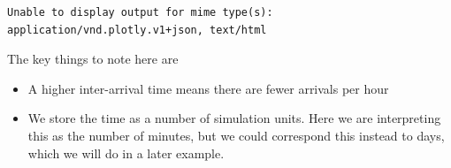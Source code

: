 \documentclass[
  letterpaper,
  DIV=11,
  numbers=noendperiod]{scrreprt}
\providecommand{\tightlist}{%
  \setlength{\itemsep}{0pt}\setlength{\parskip}{0pt}}\usepackage{longtable,booktabs,array}
\begin{document}
\begin{verbatim}
Unable to display output for mime type(s): application/vnd.plotly.v1+json, text/html
\end{verbatim}

\begin{tcolorbox}[enhanced jigsaw, colframe=quarto-callout-tip-color-frame, bottomtitle=1mm, breakable, rightrule=.15mm, coltitle=black, colbacktitle=quarto-callout-tip-color!10!white, opacityback=0, leftrule=.75mm, arc=.35mm, toptitle=1mm, title=\textcolor{quarto-callout-tip-color}{\faLightbulb}\hspace{0.5em}{Tip}, titlerule=0mm, colback=white, toprule=.15mm, bottomrule=.15mm, left=2mm, opacitybacktitle=0.6]

The key things to note here are

\begin{itemize}
\tightlist
\item
  A higher inter-arrival time means there are fewer arrivals per hour
\item
  We store the time as a number of simulation units. Here we are
  interpreting this as the number of minutes, but we could correspond
  this instead to days, which we will do in a later example.
\end{itemize}

\end{tcolorbox}
\end{document}
